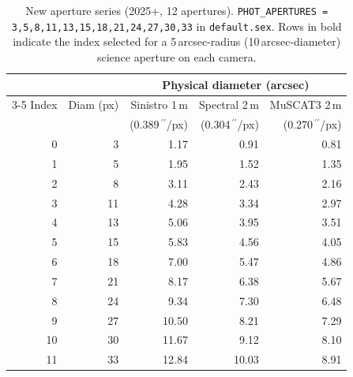 \documentclass[12pt,a4paper]{article}
\begin{document}
\begin{table}[h!]
\centering
\small
\begin{tabular}{rr rrr}
\toprule
 & & \multicolumn{3}{c}{Physical diameter (arcsec)} \\
\cmidrule(lr){3-5}
Index & Diam (px) & Sinistro 1\,m & Spectral 2\,m & MuSCAT3 2\,m \\
      &           & (0.389\,\ensuremath{^{\prime\prime}}/px) & (0.304\,\ensuremath{^{\prime\prime}}/px) & (0.270\,\ensuremath{^{\prime\prime}}/px) \\
\midrule
  0 &  3 &  1.17 &  0.91 &  0.81 \\
  1 &  5 &  1.95 &  1.52 &  1.35 \\
  2 &  8 &  3.11 &  2.43 &  2.16 \\
  3 & 11 &  4.28 &  3.34 &  2.97 \\
  4 & 13 &  5.06 &  3.95 &  3.51 \\
  5 & 15 &  5.83 &  4.56 &  4.05 \\
  6 & 18 &  7.00 &  5.47 &  4.86 \\
  7 & 21 &  8.17 &  6.38 &  5.67 \\
  8 & 24 &  9.34 &  7.30 &  6.48 \\
  9 & 27 & 10.50 &  8.21 &  7.29 \\
 10 & 30 & 11.67 &  9.12 &  8.10 \\
 11 & 33 & 12.84 & 10.03 &  8.91 \\
\bottomrule
\end{tabular}
\caption{New aperture series (2025+, 12 apertures).
  \texttt{PHOT\_\hspace{0pt}APERTURES = 3,5,8,11,13,15,18,21,24,27,30,33} in
  \texttt{default.sex}.  Rows in bold indicate the index selected for a
  5\,arcsec-radius (10\,arcsec-diameter) science aperture on each camera.}
\label{tab:aper-new}
\end{table}
\end{document}
